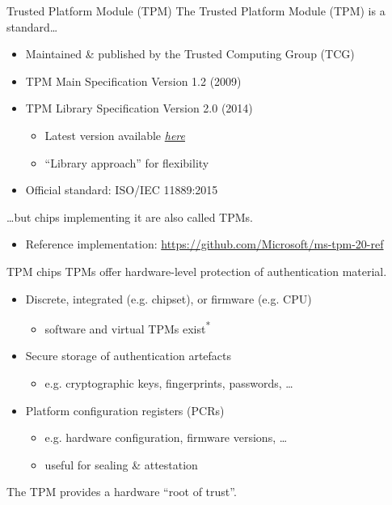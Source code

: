\begin{frame}{Trusted Platform Module (TPM)}
  \pause
  The Trusted Platform Module (TPM) is a standard\dots
  \begin{itemize}[<+(1)->]
    \item Maintained \& published by the Trusted Computing Group (TCG)
    \item TPM Main Specification Version 1.2 (2009)
    \item TPM Library Specification Version 2.0 (2014)
    \begin{itemize}
      \item Latest version available \href{https://trustedcomputinggroup.org/resource/tpm-library-specification/}{\textit{here}}
      \item \enquote{Library approach} for flexibility
    \end{itemize}
    \item Official standard: ISO/IEC 11889:2015
  \end{itemize}

  \pause
  \dots{}but chips implementing it are also called TPMs.
  \begin{itemize}
    \item Reference implementation: {\small\url{https://github.com/Microsoft/ms-tpm-20-ref}}
  \end{itemize}
\end{frame}

\begin{frame}{TPM chips}
  TPMs offer hardware-level protection of authentication material.
  \begin{itemize}[<+(1)->]
    \item Discrete, integrated (e.g. chipset), or firmware (e.g. CPU)
    \begin{itemize}
      \item software and virtual TPMs exist\textsuperscript{*}
    \end{itemize}
    \item Secure storage of authentication artefacts
    \begin{itemize}
      \item e.g. cryptographic keys, fingerprints, passwords, \dots
    \end{itemize}
    \item Platform configuration registers (PCRs)
    \begin{itemize}
      \item e.g. hardware configuration, firmware versions, \dots
      \item useful for sealing \& attestation
    \end{itemize}
  \end{itemize}

  \vspace*{1em}

  \pause
  The TPM provides a hardware \enquote{root of trust}.
\end{frame}

